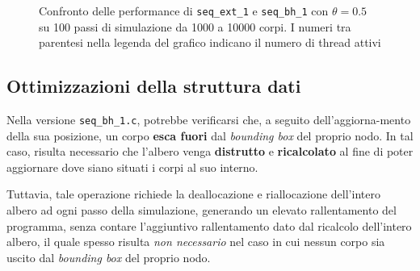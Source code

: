 \documentclass[12pt]{report}
\begin{document}
\begin{figure}[H]

        \caption{Confronto delle performance di \texttt{seq\_ext\_1} e \texttt{seq\_bh\_1} con $\theta = 0.5$ su 100 passi di simulazione da 1000 a 10000 corpi. I numeri tra parentesi nella legenda del grafico indicano il numero di thread attivi}
        \label{fig:seq_1_bh_graph}
    \end{figure}

    \newpage

    \subsection{Ottimizzazioni della struttura dati}

    Nella versione \texttt{seq\_bh\_1.c}, potrebbe verificarsi che, a seguito dell'aggiorna-mento della sua posizione, un corpo \textbf{esca fuori} dal \textit{bounding box} del proprio nodo. In tal caso, risulta necessario che l'albero venga \textbf{distrutto} e \textbf{ricalcolato} al fine di poter aggiornare dove siano situati i corpi al suo interno.

    Tuttavia, tale operazione richiede la deallocazione e riallocazione dell'intero albero ad ogni passo della simulazione, generando un elevato rallentamento del programma, senza contare l'aggiuntivo rallentamento dato dal ricalcolo dell'intero albero, il quale spesso risulta \textit{non necessario} nel caso in cui nessun corpo sia uscito dal \textit{bounding box} del proprio nodo.
\end{document}
